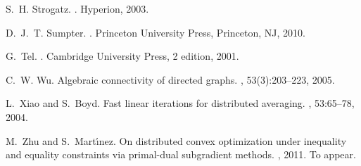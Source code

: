 \documentclass[final]{siamltex}
\begin{document}
\begin{thebibliography}{10}
S.~H. Strogatz.
.
\newblock Hyperion, 2003.

D.~J.~T. Sumpter.
.
\newblock Princeton University Press, Princeton, NJ, 2010.

G.~Tel.
.
\newblock Cambridge University Press, 2 edition, 2001.

C.~W. Wu.
\newblock Algebraic connectivity of directed graphs.
, 53(3):203--223, 2005.

L.~Xiao and S.~Boyd.
\newblock Fast linear iterations for distributed averaging.
, 53:65--78, 2004.

M.~Zhu and S.~Mart{\'\i}nez.
\newblock On distributed convex optimization under inequality and equality
  constraints via primal-dual subgradient methods.
, 2011.
\newblock To appear.

\end{thebibliography}
\end{document}
